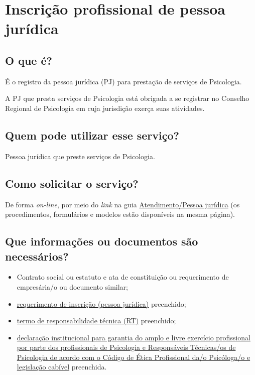\chapter{Inscrição profissional de pessoa jurídica}
\label{chap:pj-inscricao}

\section{O que é?}

É o registro da pessoa jurídica (PJ) para prestação de serviços de Psicologia.

A PJ que presta serviços de Psicologia está obrigada a se registrar no Conselho Regional de Psicologia em cuja jurisdição exerça suas atividades.

\section{Quem pode utilizar esse serviço?}

Pessoa jurídica que preste serviços de Psicologia.

\section{Como solicitar o serviço?}

De forma \emph{on-line}, por meio do \emph{link} na guia \href{https://www.crpsp.org/pagina/view/30}{Atendimento/Pessoa jurídica} (os procedimentos, formulários e modelos estão disponíveis na mesma página).

\section{Que informações ou documentos são necessários?}

\begin{itemize}
  \item  Contrato social ou estatuto e ata de constituição ou requerimento de empresária/o ou documento similar;
  \item  \hyperref[]{requerimento  de inscrição (pessoa jurídica)} preenchido;
  \item  \hyperref[]{termo  de responsabilidade técnica (RT)} preenchido;
  \item  \hyperref[]{declaração  institucional para garantia do amplo e livre exercício profissional  por parte dos profissionais de Psicologia e Responsáveis Técnicas/os de  Psicologia de acordo com o Código de Ética Profissional da/o  Psicóloga/o e legislação cabível} preenchida.
\end{itemize}

